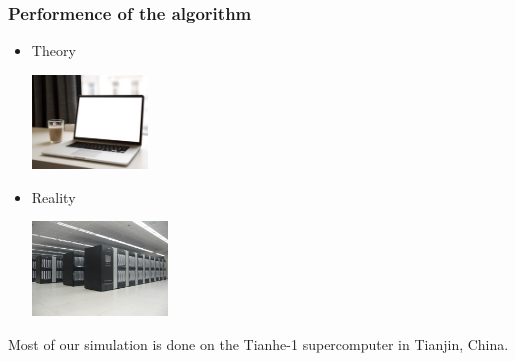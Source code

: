 \documentclass[xcolor=table, 10pt, aspectratio=169]{beamer}
\begin{document}
\begin{frame}
  \frametitle{Performence of the algorithm}
    \begin{itemize}
      \item Theory
      \begin{center}
        \includegraphics[height=2.5cm]{laptop_coffee}
      \end{center}
      \item Reality
      \begin{center}
        \includegraphics[height=2.5cm]{tianhe}
      \end{center}
    \end{itemize}
Most of our simulation is done on the Tianhe-1 supercomputer in Tianjin, China.
\end{frame}
\end{document}
